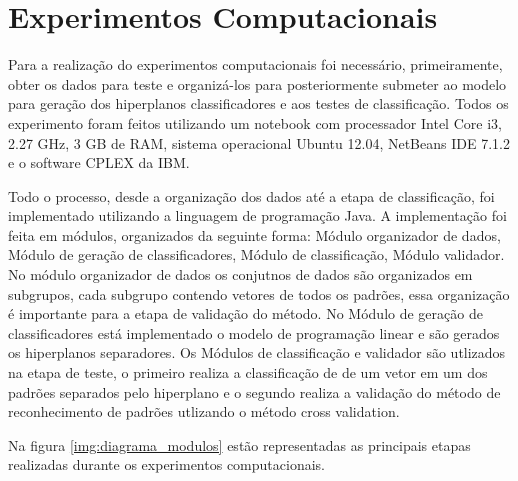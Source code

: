 \chapter{Experimentos Computacionais}
Para a realização do experimentos computacionais foi necessário, primeiramente, obter os dados para teste e organizá-los para posteriormente submeter ao modelo para geração dos hiperplanos classificadores  e aos testes de classificação. Todos os experimento foram feitos utilizando um notebook com processador Intel Core i3, 2.27 GHz, 3 GB de RAM, sistema operacional Ubuntu 12.04, NetBeans IDE 7.1.2 e o software CPLEX da IBM.

Todo o processo, desde a organização dos dados até a etapa de classificação, foi implementado utilizando a linguagem de programação Java. A implementação foi feita em módulos, organizados da seguinte forma: Módulo organizador de dados, Módulo de geração de classificadores, Módulo de classificação, Módulo validador. No módulo organizador de dados os conjutnos de dados são organizados em subgrupos, cada subgrupo contendo vetores de todos os padrões, essa organização é importante para a etapa de validação do método. No Módulo de geração de classificadores está implementado o modelo de programação linear e são gerados os hiperplanos separadores. Os Módulos de classificação e validador são utlizados na etapa de teste, o primeiro realiza a classificação de de um vetor em um dos padrões separados pelo hiperplano e o segundo realiza a validação do método de reconhecimento de padrões utlizando o método cross validation.

Na figura \ref{img:diagrama_modulos} estão representadas as principais etapas realizadas durante os experimentos computacionais.

